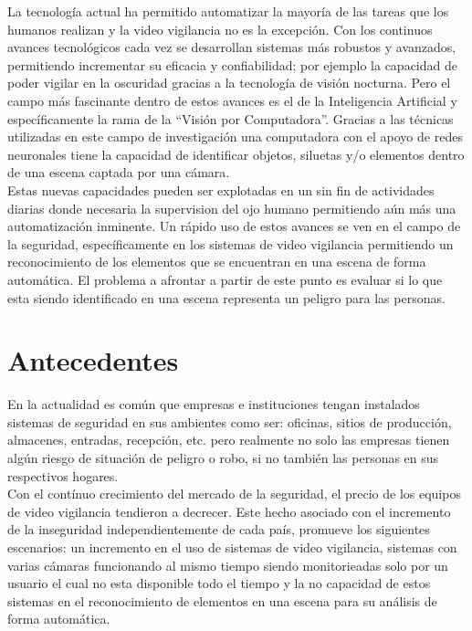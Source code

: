 La tecnología actual ha permitido automatizar la mayoría de las tareas que los humanos realizan y la video vigilancia no es la excepción. Con los continuos avances tecnológicos cada vez se desarrollan sistemas más robustos y avanzados, permitiendo incrementar su eficacia y confiabilidad; por ejemplo la capacidad de poder vigilar en la oscuridad gracias a la tecnología de visión nocturna. Pero el campo más fascinante dentro de estos avances es el de la Inteligencia Artificial y específicamente la rama de la ``Visión por Computadora''. Gracias a las técnicas utilizadas en este campo de investigación una computadora con el apoyo de redes neuronales tiene la capacidad de identificar objetos, siluetas y/o elementos dentro de una escena captada por una cámara.\\

Estas nuevas capacidades pueden ser explotadas en un sin fin de actividades diarias donde necesaria la supervision del ojo humano permitiendo aún más una automatización inminente. Un rápido uso de estos avances se ven en el campo de la seguridad, específicamente en los sistemas de video vigilancia permitiendo un reconocimiento de los elementos que se encuentran en una escena de forma automática. El problema a afrontar a partir de este punto es evaluar si lo que esta siendo identificado en una escena representa un peligro para las personas.

\section{Antecedentes}
En la actualidad es común que empresas e instituciones tengan instalados sistemas de seguridad en sus ambientes como ser: oficinas, sitios de producción, almacenes, entradas, recepción, etc. pero realmente no solo las empresas tienen algún riesgo de situación de peligro o robo, si no también las personas en sus respectivos hogares.\\

Con el contínuo crecimiento del mercado de la seguridad, el precio de los equipos de video vigilancia tendieron a decrecer. Este hecho asociado con el incremento de la inseguridad independientemente de cada país, promueve los siguientes escenarios: un incremento en el uso de sistemas de video vigilancia, sistemas con varias cámaras funcionando al mismo tiempo siendo monitorieadas solo por un usuario el cual no esta disponible todo el tiempo y la no capacidad de estos sistemas en el reconocimiento de  elementos en una escena para su análisis de forma automática.\


